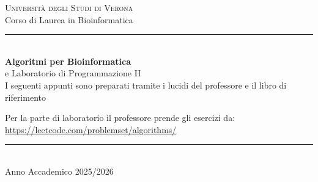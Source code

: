 \documentclass[a4paper, 11pt]{article}
\begin{document}
	\begin{titlepage}
		\centering
		\vspace*{3cm}
		{\large\scshape\color{primary} Università degli Studi di Verona}\\[0.3cm]
		{\large\color{black} Corso di Laurea in Bioinformatica}\\[0.2cm]
		\textcolor{primary}{\rule{\textwidth}{0.4pt}}\\[1.5cm]
		{\Huge\bfseries\color{primary} Algoritmi per Bioinformatica}\\[0.5cm]
		{\LARGE\color{black} e Laboratorio di Programmazione II}\\[2cm]
		\vfill
		{\large\color{black} I seguenti appunti sono preparati tramite i lucidi del professore e il libro di riferimento}
		
		{\large\color{black}} Per la parte di laboratorio il professore prende gli esercizi da:
		\url{https://leetcode.com/problemset/algorithms/}
		\textcolor{primary}{\rule{\textwidth}{0.4pt}}\\[0.5cm]
		{\large\color{black} Anno Accademico 2025/2026}
		
		
	\end{titlepage}
	\clearpage
	\tableofcontents
	\clearpage

	
	
	
	
	
	
	
	
	
	
	
	
	
	
	
	
	
\end{document}
